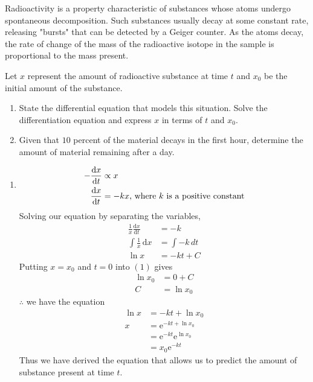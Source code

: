 \documentclass[11pt,a4paper]{book}
\begin{document}
\begin{example}

Radioactivity is a property characteristic of substances whose atoms
undergo spontaneous decomposition. Such substances usually decay at some constant rate, releasing "bursts" that can be detected by a Geiger counter. As the atoms decay, the rate of change of the mass of the radioactive isotope in the sample is proportional to the mass present.

\medskip

Let $x$ represent the amount of radioactive substance at time $t$
and $x_{0}$ be the initial amount of the substance.

\begin{enumerate}[label=(\alph*)]

\item  State the differential equation that models this situation.
Solve the differentiation equation and express $x$ in terms of $t$
and $x_{0}$.

\item  Given that $10$ percent of the material decays in the first
hour, determine the amount of material remaining after a day.

\end{enumerate}

\Solution

\begin{enumerate}[label=(\alph*)]

\item \begin{align*}
-\frac{\mathrm{d}x}{\mathrm{d}t} & \propto x\\
\frac{\mathrm{d}x}{\mathrm{d}t} & =-kx\text{, where \ensuremath{k} is a positive constant}
\end{align*}
Solving our equation by separating the variables,
\begin{align*}
\frac{1}{x}\frac{\mathrm{d}x}{\mathrm{d}t} & =-k\\
\int\frac{1}{x}\, \mathrm{d}x & =\int-k\,dt\\
\ln x & =-kt+C\tag{1}
\end{align*}
Putting $x=x_{0}$ and $t=0$ into $\left(1\right)$ gives
\begin{align*}
\ln x_{0} & =0+C\\
C & =\ln x_{0}
\end{align*}
$\therefore$ we have the equation
\begin{align*}
\ln x & =-kt+\ln x_{0}\\
x & =\mathrm{e}^{-kt+\ln x_{0}}\\
 & =\mathrm{e}^{-kt}\mathrm{e}^{\ln x_{0}}\\
 & =x_{0}\mathrm{e}^{-kt} \tag{2}
\end{align*}
Thus we have derived the equation that allows us to predict the amount of substance present at time $t$.



\end{enumerate}
\end{example}
\end{document}
